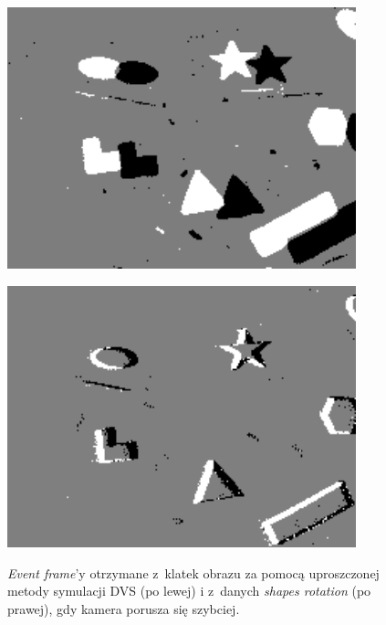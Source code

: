\begin{figure}
    \centering
    \begin{minipage}{0.5\textwidth}
        \centering
        \includegraphics[width = 0.9\textwidth]{images/shapes_fast_my.png}
        \label{gra:my_dvs_shapes_fast}
    \end{minipage}\hfill
    \begin{minipage}{0.5\textwidth}
        \centering
        \includegraphics[width = 0.9\textwidth]{images/shapes_fast_org.png}
        \label{gra:real_shapes_fast}
    \end{minipage}
    \caption{\textit{Event frame}'y otrzymane z~klatek obrazu za pomocą uproszczonej metody symulacji DVS (po lewej) i z~danych \textit{shapes rotation} \cite{dvs_dataset} (po prawej), gdy kamera porusza się szybciej.}
    \label{fig:shapes_fast}
\end{figure}


